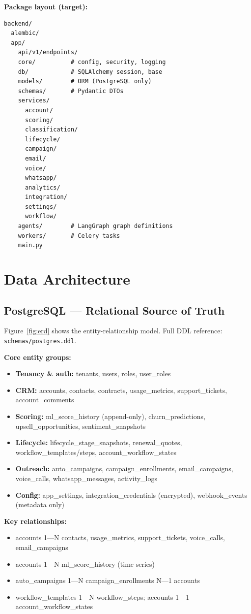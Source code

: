 \documentclass[11pt,a4paper]{article}
\begin{document}
\textbf{Package layout (target):}
\begin{lstlisting}
backend/
  alembic/
  app/
    api/v1/endpoints/
    core/          # config, security, logging
    db/            # SQLAlchemy session, base
    models/        # ORM (PostgreSQL only)
    schemas/       # Pydantic DTOs
    services/
      account/
      scoring/
      classification/
      lifecycle/
      campaign/
      email/
      voice/
      whatsapp/
      analytics/
      integration/
      settings/
      workflow/
    agents/        # LangGraph graph definitions
    workers/       # Celery tasks
    main.py
\end{lstlisting}

\section{Data Architecture}

\subsection{PostgreSQL --- Relational Source of Truth}

Figure~\ref{fig:erd} shows the entity-relationship model. Full DDL reference: \texttt{schemas/postgres.ddl}.

\textbf{Core entity groups:}
\begin{itemize}[leftmargin=1.5em, itemsep=0.2em]
    \item \textbf{Tenancy \& auth:} tenants, users, roles, user\_roles
    \item \textbf{CRM:} accounts, contacts, contracts, usage\_metrics, support\_tickets, account\_comments
    \item \textbf{Scoring:} ml\_score\_history (append-only), churn\_predictions, upsell\_opportunities, sentiment\_snapshots
    \item \textbf{Lifecycle:} lifecycle\_stage\_snapshots, renewal\_quotes, workflow\_templates/steps, account\_workflow\_states
    \item \textbf{Outreach:} auto\_campaigns, campaign\_enrollments, email\_campaigns, voice\_calls, whatsapp\_messages, activity\_logs
    \item \textbf{Config:} app\_settings, integration\_credentials (encrypted), webhook\_events (metadata only)
\end{itemize}

\textbf{Key relationships:}
\begin{itemize}[leftmargin=1.5em, itemsep=0.2em]
    \item accounts 1---N contacts, usage\_metrics, support\_tickets, voice\_calls, email\_campaigns
    \item accounts 1---N ml\_score\_history (time-series)
    \item auto\_campaigns 1---N campaign\_enrollments N---1 accounts
    \item workflow\_templates 1---N workflow\_steps; accounts 1---1 account\_workflow\_states
\end{itemize}
\end{document}

